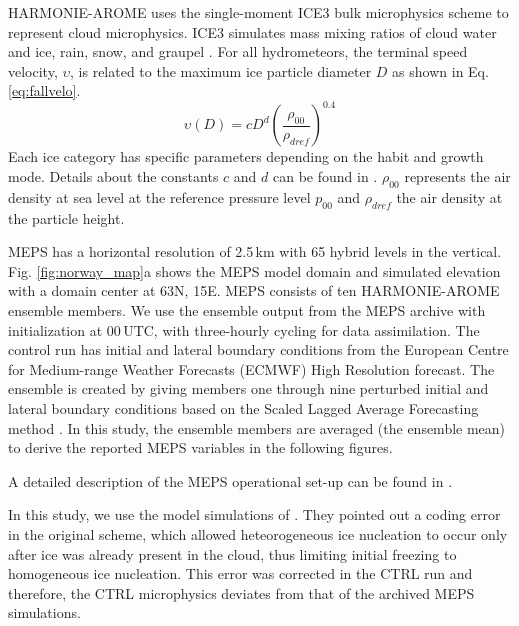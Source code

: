 \documentclass{ametsocV5}
\begin{document}
        HARMONIE-AROME uses the single-moment ICE3 bulk microphysics scheme \citep{bechtold_meso-nh_2009} to represent cloud microphysics. ICE3 simulates mass mixing ratios of cloud water and ice, rain, snow, and graupel \citep{cohard_comprehensive_2000, cohard_comprehensive_2000-1}. For all hydrometeors, the terminal speed velocity, $\upsilon$,  is related to the maximum ice particle diameter $D$ as shown in Eq. \ref{eq:fallvelo}.
        \begin{equation}
            \upsilon(D) = c D^d \left( \frac{\rho_{00}}{\rho_{dref}} \right)^{0.4}
            \label{eq:fallvelo}
        \end{equation}
        Each ice category has specific parameters depending on the habit and growth mode. Details about the constants $c$ and $d$ can be found in \citet{bechtold_meso-nh_2009}. $\rho_{00}$ represents the air density at sea level at the reference pressure level $p_{00}$ and $\rho_{dref}$ the air density at the particle height. 
        
        MEPS has a horizontal resolution of 2.5\,km with 65 hybrid levels in the vertical. Fig. \ref{fig:norway_map}a shows the MEPS model domain and simulated elevation with a domain center at 63\textdegree N, 15\textdegree E. MEPS consists of ten HARMONIE-AROME ensemble members. We use the ensemble output from the MEPS archive with initialization at 00\,UTC, with three-hourly cycling for data assimilation. The control run has initial and lateral boundary conditions from the European Centre for Medium-range Weather Forecasts (ECMWF) High Resolution forecast. The ensemble is created by giving members one through nine perturbed initial and lateral boundary conditions based on the Scaled Lagged Average Forecasting method \citep{koltzow_metcoop_2017}. In this study, the ensemble members are averaged (the ensemble mean) to derive the reported MEPS variables in the following figures. 
        
        A detailed description of the MEPS operational set-up can be found in \citet{frogner_convection-permitting_2019}. 
        
        In this study, we use the model simulations of \citet{engdahl_effects_2020}. They pointed out a coding error in the original scheme, which allowed heteorogeneous ice nucleation to occur only after ice was already present in the cloud, thus limiting initial freezing to homogeneous ice nucleation. This error was corrected in the CTRL run and therefore, the CTRL microphysics deviates from that of the archived MEPS simulations. 
        
\end{document}
